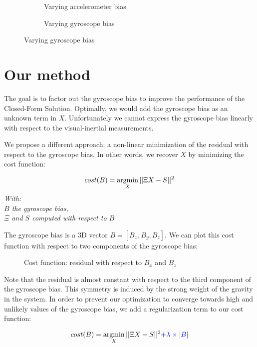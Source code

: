 \documentclass[final]{beamer}
\newcommand{\argmin}{\operatornamewithlimits{argmin}}
\begin{document}
\begin{frame}[t]
\begin{multicols}{3}
  \begin{figure}[h!]
    \caption{Speed estimation error}
    \centering
    \begin{subfigure}[b]{0.47\columnwidth}
      \resizebox{\columnwidth}{!}{}
      \caption{Varying accelerometer bias}
    \end{subfigure}
    \begin{subfigure}[b]{0.47\columnwidth}
      \resizebox{\columnwidth}{!}{}
      \caption{Varying gyroscope bias}
    \end{subfigure}
  \end{figure}


\section{Our method}

The goal is to factor out the gyroscope bias to improve the performance of the Closed-Form Solution.
Optimally, we would add the gyroscope bias as an unknown term in $X$.
Unfortunately we cannot express the gyroscope bias linearly with respect to the visual-inertial measurements.

We propose a different approach: a non-linear minimization of the residual with respect to the gyroscope bias.
In other words, we recover $X$ by minimizing the cost function:

\[
cost(B) = \argmin_X ||\Xi X - S||^2
\]
{\small \emph{With:\\
$B$ the gyroscope bias,\\
$\Xi$ and $S$ computed with respect to $B$}}

The gyroscope bias is a 3D vector $B=[B_x,B_y,B_z]$. We can plot this cost function with respect to two components of the gyroscope bias:
\begin{figure}[h!]
  \centering
  \resizebox{\columnwidth}{!}{}
  \caption{Cost function: residual with respect to $B_x$ and $B_z$}
\end{figure}

Note that the residual is almost constant with respect to the third component of the gyroscope bias.
This symmetry is induced by the strong weight of the gravity in the system.
In order to prevent our optimization to converge towards high and unlikely values of the gyroscope bias, we add a regularization term to our cost function:

\[
cost(B) = \argmin_X ||\Xi X - S||^2 \textcolor{blue}{+ \lambda \times |B|}
\]


\end{multicols}
\end{frame}
\end{document}
